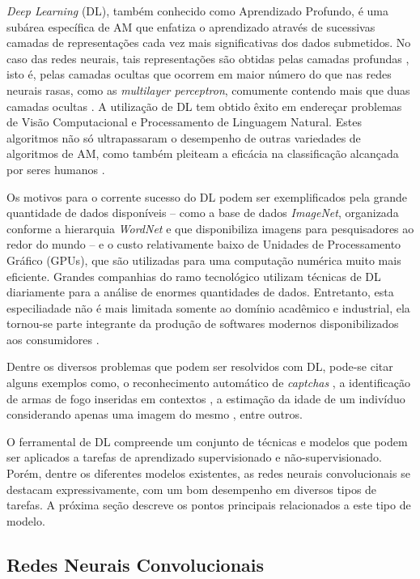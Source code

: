 
\emph{Deep Learning} (DL), também conhecido como Aprendizado Profundo, é uma subárea específica de AM que enfatiza o aprendizado através de sucessivas camadas de representações cada vez mais significativas dos dados submetidos. No caso das redes neurais, tais representações são obtidas pelas camadas profundas \cite{chollet}, isto é, pelas camadas ocultas que ocorrem em maior número do que nas redes neurais rasas, como as \emph{multilayer perceptron}, comumente contendo mais que duas camadas ocultas \cite{heaton}. A utilização de DL tem obtido êxito em endereçar problemas de Visão Computacional e Processamento de Linguagem Natural. Estes algoritmos não só ultrapassaram o desempenho de outras variedades de algoritmos de AM, como também pleiteam a eficácia na classificação alcançada por seres humanos \cite{buduma}.

Os motivos para o corrente sucesso do DL podem ser exemplificados pela grande quantidade de dados disponíveis -- como a base de dados \emph{ImageNet}, organizada conforme a hierarquia \emph{WordNet} e que disponibiliza imagens para pesquisadores ao redor do mundo \cite{imagenet} -- e o custo relativamente baixo de Unidades de Processamento Gráfico (GPUs), que são utilizadas para uma computação numérica muito mais eficiente. Grandes companhias do ramo tecnológico utilizam técnicas de DL diariamente para a análise de enormes quantidades de dados. Entretanto, esta especiliadade não é mais limitada somente ao domínio acadêmico e industrial, ela tornou-se parte integrante da produção de softwares modernos disponibilizados aos consumidores \cite{gulli}.

Dentre os diversos problemas que podem ser resolvidos com DL, pode-se citar alguns exemplos como, o reconhecimento automático de \emph{captchas} \cite{sergio-tcc}, a identificação de armas de fogo inseridas em contextos \cite{janderson-tcc}, a estimação da idade de um indivíduo considerando apenas uma imagem do mesmo \cite{nicoli-tcc}, entre outros.

O ferramental de DL compreende um conjunto de técnicas e modelos que podem ser aplicados a tarefas de aprendizado supervisionado e não-supervisionado. Porém, dentre os diferentes modelos existentes, as redes neurais convolucionais se destacam expressivamente, com um bom desempenho em diversos tipos de tarefas. A próxima seção descreve os pontos principais relacionados a este tipo de modelo.

\subsection{Redes Neurais Convolucionais}
\label{subsubsec:cnns}

